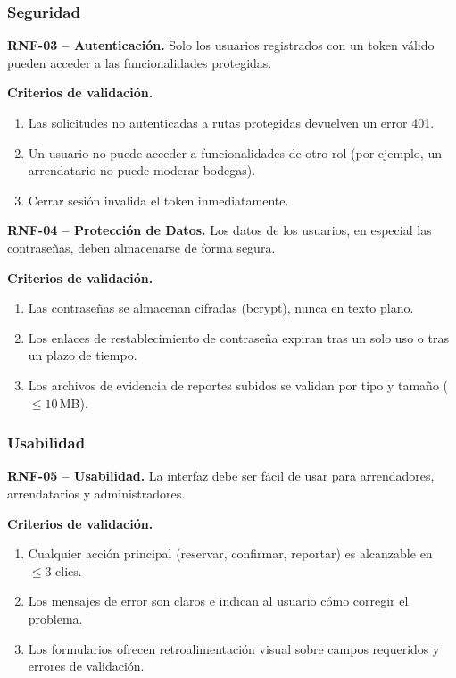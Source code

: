 \subsubsection*{Seguridad}

\textbf{RNF-03 -- Autenticación.} \label{req:RNF-03}
Solo los usuarios registrados con un token válido pueden acceder a las funcionalidades protegidas.

\textbf{Criterios de validación.}
\begin{enumerate}
\item Las solicitudes no autenticadas a rutas protegidas devuelven un error 401.
\item Un usuario no puede acceder a funcionalidades de otro rol (por ejemplo, un arrendatario no puede moderar bodegas).
\item Cerrar sesión invalida el token inmediatamente.
\end{enumerate}

\textbf{RNF-04 -- Protección de Datos.} \label{req:RNF-04}
Los datos de los usuarios, en especial las contraseñas, deben almacenarse de forma segura.

\textbf{Criterios de validación.}
\begin{enumerate}
\item Las contraseñas se almacenan cifradas (bcrypt), nunca en texto plano.
\item Los enlaces de restablecimiento de contraseña expiran tras un solo uso o tras un plazo de tiempo.
\item Los archivos de evidencia de reportes subidos se validan por tipo y tamaño ($\leq 10$\,MB).
\end{enumerate}

\subsubsection*{Usabilidad}

\textbf{RNF-05 -- Usabilidad.} \label{req:RNF-05}
La interfaz debe ser fácil de usar para arrendadores, arrendatarios y administradores.

\textbf{Criterios de validación.}
\begin{enumerate}
\item Cualquier acción principal (reservar, confirmar, reportar) es alcanzable en $\leq 3$ clics.
\item Los mensajes de error son claros e indican al usuario cómo corregir el problema.
\item Los formularios ofrecen retroalimentación visual sobre campos requeridos y errores de validación.
\end{enumerate}


